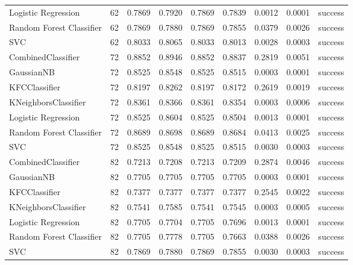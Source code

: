 \begin{table}
\begin{tabular}{lrrrrrrrl}
Logistic Regression & 62 & 0.7869 & 0.7920 & 0.7869 & 0.7839 & 0.0012 & 0.0001 & success \\
Random Forest Classifier & 62 & 0.7869 & 0.7880 & 0.7869 & 0.7855 & 0.0379 & 0.0026 & success \\
SVC & 62 & 0.8033 & 0.8065 & 0.8033 & 0.8013 & 0.0028 & 0.0003 & success \\
CombinedClassifier & 72 & 0.8852 & 0.8946 & 0.8852 & 0.8837 & 0.2819 & 0.0051 & success \\
GaussianNB & 72 & 0.8525 & 0.8548 & 0.8525 & 0.8515 & 0.0003 & 0.0001 & success \\
KFCClassifier & 72 & 0.8197 & 0.8262 & 0.8197 & 0.8172 & 0.2619 & 0.0019 & success \\
KNeighborsClassifier & 72 & 0.8361 & 0.8366 & 0.8361 & 0.8354 & 0.0003 & 0.0006 & success \\
Logistic Regression & 72 & 0.8525 & 0.8604 & 0.8525 & 0.8504 & 0.0013 & 0.0001 & success \\
Random Forest Classifier & 72 & 0.8689 & 0.8698 & 0.8689 & 0.8684 & 0.0413 & 0.0025 & success \\
SVC & 72 & 0.8525 & 0.8548 & 0.8525 & 0.8515 & 0.0030 & 0.0003 & success \\
CombinedClassifier & 82 & 0.7213 & 0.7208 & 0.7213 & 0.7209 & 0.2874 & 0.0046 & success \\
GaussianNB & 82 & 0.7705 & 0.7705 & 0.7705 & 0.7705 & 0.0003 & 0.0001 & success \\
KFCClassifier & 82 & 0.7377 & 0.7377 & 0.7377 & 0.7377 & 0.2545 & 0.0022 & success \\
KNeighborsClassifier & 82 & 0.7541 & 0.7585 & 0.7541 & 0.7545 & 0.0003 & 0.0005 & success \\
Logistic Regression & 82 & 0.7705 & 0.7704 & 0.7705 & 0.7696 & 0.0013 & 0.0001 & success \\
Random Forest Classifier & 82 & 0.7705 & 0.7778 & 0.7705 & 0.7663 & 0.0388 & 0.0026 & success \\
SVC & 82 & 0.7869 & 0.7880 & 0.7869 & 0.7855 & 0.0030 & 0.0003 & success \\
\bottomrule
\end{tabular}
\end{table}
